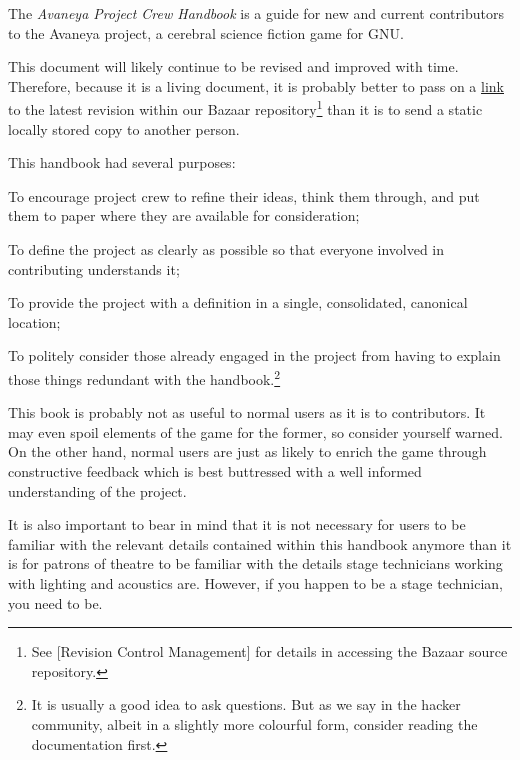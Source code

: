 

The {\it Avaneya Project Crew Handbook} is a guide for new and current contributors to the Avaneya project, a cerebral science fiction game for GNU. 

This document will likely continue to be revised and improved with time. Therefore, because it is a living document, it is probably better to pass on a \href{http://bazaar.launchpad.net/~avaneya/avaneya/trunk/view/head:/Documentation/Contributors/Handbook/Avaneya\%20Project\%20Crew\%20Handbook.pdf}{link} to the latest revision within our Bazaar repository\footnote[]{See [Revision Control Management] for details in accessing the Bazaar source repository.} than it is to send a static locally stored copy to another person.

This handbook had several purposes:

\startitemize[4]
\item
To encourage project crew to refine their ideas, think them through, and put them to paper where they are available for consideration;

\item
To define the project as clearly as possible so that everyone involved in contributing understands it;

\item
To provide the project with a definition in a single, consolidated, canonical location;

\item
To politely consider those already engaged in the project from having to explain those things redundant with the handbook.\footnote[rtfm]{It is usually a good idea to ask questions. But as we say in the hacker community, albeit in a slightly more colourful form, consider reading the documentation first.}
\stopitemize

This book is probably not as useful to normal users as it is to contributors. It may even spoil elements of the game for the former, so consider yourself warned. On the other hand, normal users are just as likely to enrich the game through constructive feedback which is best buttressed with a well informed understanding of the project.

It is also important to bear in mind that it is not necessary for users to be familiar with the relevant details contained within this handbook anymore than it is for patrons of theatre to be familiar with the details stage technicians working with lighting and acoustics are. However, if you happen to be a stage technician, you need to be.

\StopChapter

